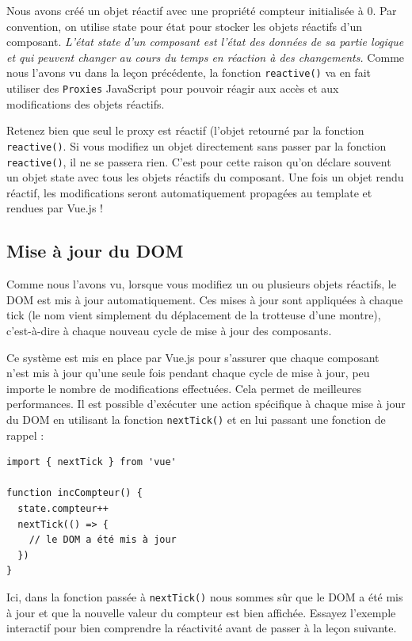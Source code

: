 \documentclass{article}
\begin{document}
Nous avons créé un objet réactif avec une propriété {\color{monOrange}compteur} initialisée à 0. Par convention, on utilise {\color{monOrange}state} pour état pour stocker les objets réactifs d'un composant.
{\em 
L'état {\color{monOrange}state} d'un composant est l'état des données de sa partie logique et qui peuvent changer au cours du temps en réaction à des changements.
}
Comme nous l'avons vu dans la leçon précédente, la fonction {\tt reactive()} va en fait utiliser des {\tt Proxies} JavaScript pour pouvoir réagir aux accès et aux modifications des objets réactifs.

Retenez bien que seul le proxy est réactif (l'objet retourné par la fonction {\tt reactive()}. Si vous modifiez un objet directement sans passer par la fonction {\tt reactive()}, il ne se passera rien. C'est pour cette raison qu'on déclare souvent un objet {\color{monOrange}state} avec tous les objets réactifs du composant. Une fois un objet rendu réactif, les modifications seront automatiquement propagées au template et rendues par Vue.js !

\subsection{Mise à jour du DOM}
Comme nous l'avons vu, lorsque vous modifiez un ou plusieurs objets réactifs, le DOM est mis à jour automatiquement. Ces mises à jour sont appliquées à chaque {\color{monOrange}tick} (le nom vient simplement du déplacement de la trotteuse d'une montre), c'est-à-dire à chaque nouveau cycle de mise à jour des composants.

Ce système est mis en place par {\color{monOrange}Vue.js} pour s'assurer que chaque composant n'est mis à jour qu'une seule fois pendant chaque cycle de mise à jour, peu importe le nombre de modifications effectuées. Cela permet de meilleures performances. Il est possible d'exécuter une action spécifique à chaque mise à jour du DOM en utilisant la fonction {\tt nextTick()} et en lui passant une fonction de rappel :
\begin{verbatim}
import { nextTick } from 'vue'

function incCompteur() {
  state.compteur++
  nextTick(() => {
    // le DOM a été mis à jour
  })
}
\end{verbatim}
Ici, dans la fonction passée à {\tt nextTick()} nous sommes sûr que le DOM a été mis à jour et que la nouvelle valeur du compteur est bien affichée. Essayez l'exemple interactif pour bien comprendre la réactivité avant de passer à la leçon suivante.
\end{document}
